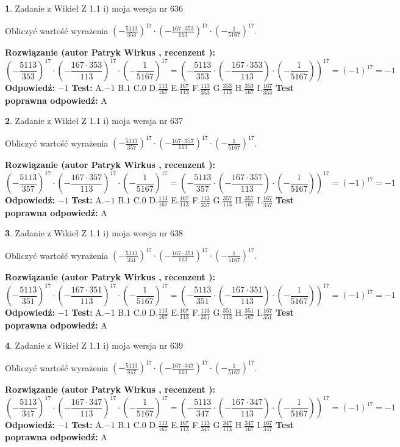 \documentclass[12pt, a4paper]{article}
\theoremstyle{definition} %
\newtheorem{zad}{}
\newcommand{\zadStart}[1]{\begin{zad}#1\newline}
\newcommand{\zadStop}{\end{zad}}
\newcommand{\rozwStart}[2]{\noindent \textbf{Rozwiązanie (autor #1 , recenzent #2): }\newline}
\newcommand{\rozwStop}{\newline}
\newcommand{\odpStart}{\noindent \textbf{Odpowiedź:}\newline}
\newcommand{\odpStop}{\newline}
\newcommand{\testStart}{\noindent \textbf{Test:}\newline}
\newcommand{\testStop}{\newline}
\newcommand{\kluczStart}{\noindent \textbf{Test poprawna odpowiedź:}\newline}
\newcommand{\kluczStop}{\newline}
\begin{document}
\zadStart{Zadanie z Wikieł Z 1.1 i) moja wersja nr 636}

Obliczyć wartość wyrażenia $(-\frac{5113}{353})^{17} \cdot (-\frac{167 \cdot 353}{113})^{17} \cdot (-\frac{1}{5167})^{17}$.
\zadStop
\rozwStart{Patryk Wirkus}{}
$$(-\frac{5113}{353})^{17} \cdot (-\frac{167 \cdot 353}{113})^{17} \cdot (-\frac{1}{5167})^{17} = (-\frac{5113}{353} \cdot (-\frac{167 \cdot 353}{113}) \cdot (-\frac{1}{5167}))^{17} = (-1)^{17} = -1$$
\rozwStop
\odpStart
$-1$
\odpStop
\testStart
A.$-1$ B.$1$ C.$0$ D.$\frac{113}{167}$ E.$\frac{167}{113}$
F.$\frac{113}{353}$ G.$\frac{353}{113}$
H.$\frac{353}{167}$
I.$\frac{167}{353}$
\testStop
\kluczStart
A
\kluczStop



\zadStart{Zadanie z Wikieł Z 1.1 i) moja wersja nr 637}

Obliczyć wartość wyrażenia $(-\frac{5113}{357})^{17} \cdot (-\frac{167 \cdot 357}{113})^{17} \cdot (-\frac{1}{5167})^{17}$.
\zadStop
\rozwStart{Patryk Wirkus}{}
$$(-\frac{5113}{357})^{17} \cdot (-\frac{167 \cdot 357}{113})^{17} \cdot (-\frac{1}{5167})^{17} = (-\frac{5113}{357} \cdot (-\frac{167 \cdot 357}{113}) \cdot (-\frac{1}{5167}))^{17} = (-1)^{17} = -1$$
\rozwStop
\odpStart
$-1$
\odpStop
\testStart
A.$-1$ B.$1$ C.$0$ D.$\frac{113}{167}$ E.$\frac{167}{113}$
F.$\frac{113}{357}$ G.$\frac{357}{113}$
H.$\frac{357}{167}$
I.$\frac{167}{357}$
\testStop
\kluczStart
A
\kluczStop



\zadStart{Zadanie z Wikieł Z 1.1 i) moja wersja nr 638}

Obliczyć wartość wyrażenia $(-\frac{5113}{351})^{17} \cdot (-\frac{167 \cdot 351}{113})^{17} \cdot (-\frac{1}{5167})^{17}$.
\zadStop
\rozwStart{Patryk Wirkus}{}
$$(-\frac{5113}{351})^{17} \cdot (-\frac{167 \cdot 351}{113})^{17} \cdot (-\frac{1}{5167})^{17} = (-\frac{5113}{351} \cdot (-\frac{167 \cdot 351}{113}) \cdot (-\frac{1}{5167}))^{17} = (-1)^{17} = -1$$
\rozwStop
\odpStart
$-1$
\odpStop
\testStart
A.$-1$ B.$1$ C.$0$ D.$\frac{113}{167}$ E.$\frac{167}{113}$
F.$\frac{113}{351}$ G.$\frac{351}{113}$
H.$\frac{351}{167}$
I.$\frac{167}{351}$
\testStop
\kluczStart
A
\kluczStop



\zadStart{Zadanie z Wikieł Z 1.1 i) moja wersja nr 639}

Obliczyć wartość wyrażenia $(-\frac{5113}{347})^{17} \cdot (-\frac{167 \cdot 347}{113})^{17} \cdot (-\frac{1}{5167})^{17}$.
\zadStop
\rozwStart{Patryk Wirkus}{}
$$(-\frac{5113}{347})^{17} \cdot (-\frac{167 \cdot 347}{113})^{17} \cdot (-\frac{1}{5167})^{17} = (-\frac{5113}{347} \cdot (-\frac{167 \cdot 347}{113}) \cdot (-\frac{1}{5167}))^{17} = (-1)^{17} = -1$$
\rozwStop
\odpStart
$-1$
\odpStop
\testStart
A.$-1$ B.$1$ C.$0$ D.$\frac{113}{167}$ E.$\frac{167}{113}$
F.$\frac{113}{347}$ G.$\frac{347}{113}$
H.$\frac{347}{167}$
I.$\frac{167}{347}$
\testStop
\kluczStart
A
\kluczStop
\end{document}
